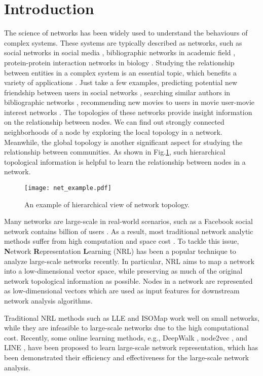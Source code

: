 \documentclass[conference]{IEEEtran}
\begin{document}
\section{Introduction}
The science of networks has been widely used to understand the behaviours of complex systems. These systems are typically described as networks, such as social networks in social media \cite{scott2017social}, bibliographic networks in academic field \cite{sun2011pathsim}, protein-protein interaction networks in biology \cite{theocharidis2009network}. Studying the relationship between entities in a complex system is an essential topic, which benefits a variety of applications \cite{goyal2018graph}. Just take a few examples, predicting potential new friendship between users in social networks \cite{yang2011like}, searching similar authors in bibliographic networks \cite{sun2011pathsim}, recommending new movies to users in movie user-movie interest networks \cite{diao2014jointly}. The topologies of these networks provide insight information on the relationship between nodes. We can find out strongly connected neighborhoods of a node by exploring the local topology in a network. Meanwhile, the global topology is another significant aspect for studying the relationship between communities. As shown in Fig.\ref{figure1}, such hierarchical topological information is helpful to learn the relationship between nodes in a network.

\begin{figure}
	\centering
	\texttt{[image: net\_example.pdf]}
	\caption{An example of hierarchical view of network topology.}
	\label{figure1}
\end{figure}

Many networks are large-scale in real-world scenarios, such as a Facebook social network contains billion of users \cite{ellison2007benefits}. As a result, most traditional network analytic methods suffer from high computation and space cost \cite{goyal2018graph}. To tackle this issue, \textbf{N}etwork \textbf{R}epresentation \textbf{L}earning (NRL) has been a popular technique to analyze large-scale networks recently. In particular, NRL aims to map a network into a low-dimensional vector space, while preserving as much of the original network topological information as possible. Nodes in a network are represented as low-dimensional vectors which are used as input features for downstream network analysis algorithms.

Traditional NRL methods such as LLE \cite{roweis2000nonlinear} and ISOMap \cite{tenenbaum2000global} work well on small networks, while they are infeasible to large-scale networks due to the high computational cost. Recently, some online learning methods, e.g., DeepWalk \cite{perozzi2014deepwalk}, node2vec \cite{grover2016node2vec}, and LINE \cite{tang2015line}, have been proposed to learn large-scale network representation, which has been demonstrated their efficiency and effectiveness for the large-scale network analysis.
\end{document}
